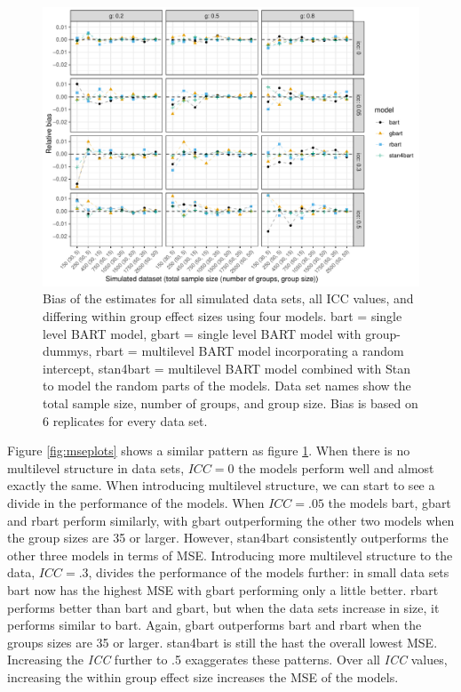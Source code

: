 \documentclass[10pt, a4paper, titlepage]{article}
\begin{document}
\begin{figure}[H]
\caption{Bias of the estimates for all simulated data sets, all ICC values, and differing within group effect sizes using four models. bart = single level BART model, gbart = single level BART model with group-dummys, rbart = multilevel BART model incorporating a random intercept, stan4bart = multilevel BART model combined with Stan to model the random parts of the models. Data set names show the total sample size, number of groups, and group size. Bias is based on 6 replicates for every data set.}
\centering
\label{fig:biasplots}
\includegraphics[width=\textwidth]{biasplots4.pdf}
\end{figure}

Figure \ref{fig:mseplots} shows a similar pattern as figure \ref{fig:biasplots}. When there is no multilevel structure in data sets, $ICC = 0$ the models perform well and almost exactly the same. When introducing multilevel structure, we can start to see a divide in the performance of the models. When $ICC = .05$ the models bart, gbart and rbart perform similarly, with gbart outperforming the other two models when the group sizes are 35 or larger. However, stan4bart consistently outperforms the other three models in terms of MSE. Introducing more multilevel structure to the data, $ICC = .3$, divides the performance of the models further: in small data sets bart now has the highest MSE with gbart performing only a little better. rbart performs better than bart and gbart, but when the data sets increase in size, it performs similar to bart. Again, gbart outperforms bart and rbart when the groups sizes are 35 or larger. stan4bart is still the hast the overall lowest MSE. Increasing the \textit{ICC} further to .5 exaggerates these patterns. Over all \textit{ICC} values, increasing the within group effect size increases the MSE of the models.
\end{document}
